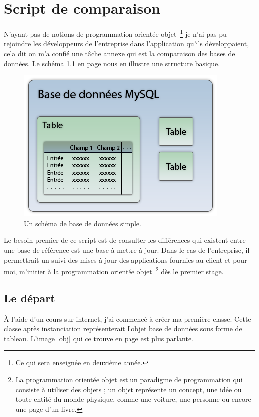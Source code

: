 \chapter{Script de comparaison}

N'ayant pas de notions de programmation orientée objet\, \footnote{Ce qui sera
enseignée en deuxième année.} je n'ai pas pu rejoindre les développeurs de
l'entreprise dans l'application qu'ils développaient, cela dit on m'a confié
une tâche annexe qui est la comparaison des bases de données. Le schéma
\ref{bdd} en page \pageref{bdd} nous en illustre une structure basique.

\begin{figure}
\begin{center}
\includegraphics[scale=0.5]{images/bdd.png}
\end{center}
\caption{Un schéma de base de données simple.}
\label{bdd}
\end{figure}

Le besoin premier de ce script est de consulter les différences qui existent
entre une base de référence est une base à mettre à jour. Dans le cas de
l'entreprise, il permettrait un suivi des mises à jour des applications
fournies au client et pour moi, m'initier à la programmation orientée objet\,
\footnote{La programmation orientée objet est un paradigme de programmation qui
consiste à utiliser des objets ; un objet représente un concept, une idée ou
toute entité du monde physique, comme une voiture, une personne ou encore une
page d'un livre.} dès le premier stage.

\section{Le départ}

À l'aide d'un cours sur internet, j'ai commencé à créer ma première classe.
Cette classe après instanciation représenterait l'objet \og base de données
\fg{} sous forme de tableau. L'image \ref{obj} qui ce trouve en page
\pageref{obj} est plus parlante.


